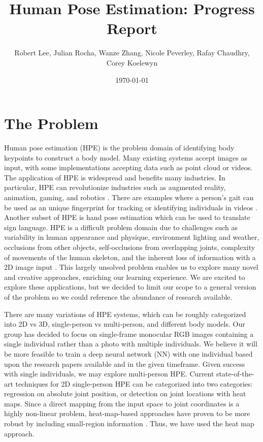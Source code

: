 \documentclass[11pt, letterpaper]{article}
\title{\textbf{Human Pose Estimation: Progress Report}}
\author{Robert Lee, Julian Rocha, Wanze Zhang, Nicole Peverley, Rafay Chaudhry, Corey Koelewyn}
\date{\today}
\begin{document}
\maketitle

\section{The Problem}

Human pose estimation (HPE) is the problem domain of identifying body keypoints to construct a body model. Many existing systems accept images as input, with some implementations accepting data such as point cloud or videos. The application of HPE is widespread and benefits many industries. In particular, HPE can revolutionize industries such as augmented reality, animation, gaming, and robotics \cite{fritz_ai_hpe}. There are examples where a person’s gait can be used as an unique fingerprint for tracking or identifying individuals in videos \cite{ZENG_2012_92}. Another subset of HPE is hand pose estimation which can be used to translate sign language. HPE is a difficult problem domain due to challenges such as variability in human appearance and physique, environment lighting and weather, occlusions from other objects, self-occlusions from overlapping joints, complexity of movements of the human skeleton, and the inherent loss of information with a 2D image input \cite{Sigal2014}. This largely unsolved problem enables us to explore many novel and creative approaches, enriching our learning experience. We are excited to explore these applications, but we decided to limit our scope to a general version of the problem so we could reference the abundance of research available.

There are many variations of HPE systems, which can be roughly categorized into 2D vs 3D, single-person vs multi-person, and different body models. Our group has decided to focus on single-frame monocular RGB images containing a single individual rather than a photo with multiple individuals. We believe it will be more feasible to train a deep neural network (NN) with one individual based upon the research papers available and in the given timeframe. Given success with single individuals, we may explore multi-person HPE. Current state-of-the-art techniques for 2D single-person HPE can be categorized into two categories: regression on absolute joint position, or detection on joint locations with heat maps. Since a direct mapping from the input space to joint coordinates is a highly non-linear problem, heat-map-based approaches have proven to be more robust by including small-region information \cite{Chen_2020}. Thus, we have used the heat map approach.
\end{document}
